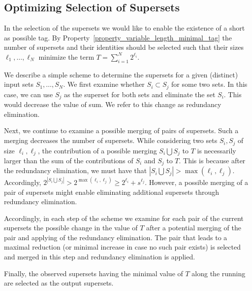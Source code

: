 \subsection{Optimizing Selection of Supersets}
In the selection of the supersets we would like to enable the existence of a short as possible tag. By Property~\ref{property_variable_length_minimal_tag} the number of supersets and their identities should be selected such that their sizes $\ell_1, \ldots, \ell_N$ minimize the term $T = \sum_{i = 1}^{N}{2^{\ell_i}}$. 

We describe a simple scheme to determine the supersets for a given (distinct) input sets $S_1, \ldots, S_N$. We first examine whether $S_i \subset S_j$ for some two sets. In this case, we can use  $S_j$ as the superset for both sets and eliminate the set $S_i$. This would decrease the value of sum. We refer to this change as redundancy elimination.

Next,  we continue to examine a possible merging of pairs of supersets. Such a merging decreases the number of supersets. While considering two sets $S_i, S_j$ of 
size $\ell_i, \ell_j$, the contribution of  a possible merging $S_i \bigcup S_j$ to $T$ is necessarily larger than  the sum of the contributions of $S_i$ and $S_j$ to $T$.
This is because after the redundancy elimination, we must have that $|S_i \bigcup S_j| > \max(\ell_i, \ell_j)$. Accordingly,  $2^{|S_i \bigcup S_j|} > 2^{\max(\ell_i, \ell_j)} \ge 
2^{\ell_i} + s^{\ell_j}$. However, a possible merging of a pair of supersets might enable eliminating additional supersets through redundancy elimination.

Accordingly, in each step of the scheme we examine for each pair of the current supersets the possible change in the value of $T$ after a potential merging of the pair and applying of the redundancy elimination. The pair that leads to a maximal reduction (or minimal increase in case no such pair exists) is selected and merged in this step and  redundancy elimination is applied. 

Finally,  the observed supersets having the minimal value of $T$ along the running are selected as the output supersets.
 